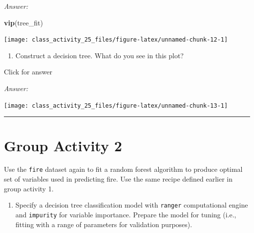 \documentclass[
]{book}
\newenvironment{Shaded}{\begin{snugshade}}{\end{snugshade}}
\newcommand{\AttributeTok}[1]{\textcolor[rgb]{0.13,0.29,0.53}{#1}}
\newcommand{\ConstantTok}[1]{\textcolor[rgb]{0.56,0.35,0.01}{#1}}
\newcommand{\FunctionTok}[1]{\textcolor[rgb]{0.13,0.29,0.53}{\textbf{#1}}}
\newcommand{\NormalTok}[1]{#1}
\newcommand{\SpecialCharTok}[1]{\textcolor[rgb]{0.81,0.36,0.00}{\textbf{#1}}}
\providecommand{\tightlist}{%
  \setlength{\itemsep}{0pt}\setlength{\parskip}{0pt}}
\begin{document}
\emph{Answer:}

\begin{Shaded}
\begin{Highlighting}[]
\FunctionTok{vip}\NormalTok{(tree\_fit)}
\end{Highlighting}
\end{Shaded}

\texttt{[image: class\_activity\_25\_files/figure-latex/unnamed-chunk-12-1]}

\begin{enumerate}
\def\labelenumi{\alph{enumi}.}
\setcounter{enumi}{10}
\tightlist
\item
  Construct a decision tree. What do you see in this plot?
\end{enumerate}

Click for answer

\emph{Answer:}

\begin{Shaded}
\end{Shaded}

\texttt{[image: class\_activity\_25\_files/figure-latex/unnamed-chunk-13-1]}

\begin{center}\rule{0.5\linewidth}{0.5pt}\end{center}

\hypertarget{group-activity-2-9}{%
\section{Group Activity 2}\label{group-activity-2-9}}

Use the \texttt{fire} dataset again to fit a random forest algorithm to produce optimal set of variables used in predicting fire. Use the same recipe defined earlier in group activity 1.

\begin{enumerate}
\def\labelenumi{\alph{enumi}.}
\tightlist
\item
  Specify a decision tree classification model with \texttt{ranger} computational engine and \texttt{impurity} for variable importance. Prepare the model for tuning (i.e., fitting with a range of parameters for validation purposes).
\end{enumerate}
\end{document}

